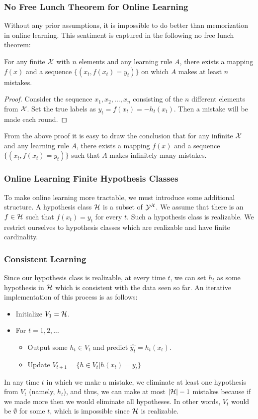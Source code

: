 \documentclass{article}
\begin{document}
\subsubsection{No Free Lunch Theorem for Online Learning}
Without any prior assumptions, it is impossible to do better than memorization in online learning. This sentiment is captured in the following no free lunch theorem:

\begin{proposition}
For any finite $\mathcal{X}$ with $n$ elements and any learning rule $A$, there exists a mapping $f(x)$ and a sequence $\{(x_t, f(x_t) = y_t)\}$ on which $A$ makes at least $n$ mistakes. 
\end{proposition}
\begin{proof}
Consider the sequence $x_1, x_2,...,x_n$ consisting of the $n$ different elements from $\mathcal{X}$. Set the true labels as $y_t = f(x_t) = -h_t(x_t)$. Then a mistake will be made each round.
\end{proof}
From the above proof it is easy to draw the conclusion that for any infinite $\mathcal{X}$ and any learning rule $A$, there exists a mapping $f(x)$ and a sequence $\{(x_t, f(x_t) = y_t)\}$ such that $A$ makes infinitely many mistakes.
\subsubsection{Online Learning Finite Hypothesis Classes}
To make online learning more tractable, we must introduce some additional structure. A hypothesis class $\mathcal{H}$ is a subset of $\mathcal{Y}^{\mathcal{X}}$. We assume that there is an $f \in \mathcal{H}$ such that $f(x_t) = y_t$ for every $t$. Such a hypothesis class is realizable. We restrict ourselves to hypothesis classes which are realizable and have finite cardinality.
\subsubsection{Consistent Learning}
Since our hypothesis class is realizable, at every time $t$, we can set $h_t$ as some hypothesis in $\mathcal{H}$ which is consistent with the data seen so far. An iterative implementation of this process is as follows:
\begin{itemize}
    \item Initialize $V_1 = \mathcal{H}$.
    \item For $t = 1, 2,...$
        \begin{itemize}
            \item Output some $h_t \in V_t$ and predict $\hat{y_t} = h_t(x_t)$.
            \item Update $V_{t+1} = \{h \in V_t | h(x_t) = y_t\}$
        \end{itemize}
\end{itemize}
In any time $t$ in which we make a mistake, we eliminate at least one hypothesis from $V_t$ (namely, $h_t$), and thus, we can make at most $|\mathcal{H}| -1$ mistakes because if we made more then we would eliminate all hypotheses. In other words, $V_t$ would be $\emptyset$ for some $t$, which is impossible since $\mathcal{H}$ is realizable.
\end{document}
